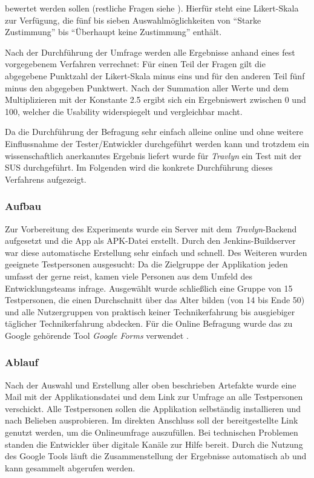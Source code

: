 bewertet werden sollen (restliche Fragen siehe \cite{Brooke.1996}). Hierfür steht eine Likert-Skala \cite{Joshi.2015} zur Verfügung, die fünf bis sieben Auswahlmöglichkeiten von \enquote{Starke Zustimmung} bis \enquote{Überhaupt keine Zustimmung} enthält.

\vspace{0.25cm}

Nach der Durchführung der Umfrage werden alle Ergebnisse anhand eines fest vorgegebenem Verfahren verrechnet: Für einen Teil der Fragen gilt die abgegebene Punktzahl der Likert-Skala minus eins und für den anderen Teil fünf minus den abgegeben Punktwert. Nach der Summation aller Werte und dem Multiplizieren mit der Konstante 2.5 ergibt sich ein Ergebniswert zwischen 0 und 100, welcher die Usability widerspiegelt und vergleichbar macht.

\vspace{0.25cm}

Da die Durchführung der Befragung sehr einfach alleine online und ohne weitere Einflussnahme der Tester/Entwickler durchgeführt werden kann und trotzdem ein wissenschaftlich anerkanntes Ergebnis liefert wurde für \textit{Travlyn} ein Test mit der \acs{SUS} durchgeführt. Im Folgenden wird die konkrete Durchführung dieses Verfahrens aufgezeigt.    
	
		\subsubsection{Aufbau}
		Zur Vorbereitung des Experiments wurde ein Server mit dem \textit{Travlyn}-Backend aufgesetzt und die App als \acs{APK}-Datei erstellt. Durch den Jenkins-Buildserver war diese automatische Erstellung sehr einfach und schnell. Des Weiteren wurden geeignete Testpersonen ausgesucht: Da die Zielgruppe der Applikation jeden umfasst der gerne reist, kamen viele Personen aus dem Umfeld des Entwicklungsteams infrage. Ausgewählt wurde schließlich eine Gruppe von 15 Testpersonen, die einen Durchschnitt über das Alter bilden (von 14 bis Ende 50) und alle Nutzergruppen von praktisch keiner Technikerfahrung bis ausgiebiger täglicher Technikerfahrung abdecken. Für die Online Befragung wurde das zu Google gehörende Tool \textit{Google Forms} verwendet \cite{Google.2020}.
		
		\subsubsection{Ablauf}
		Nach der Auswahl und Erstellung aller oben beschrieben Artefakte wurde eine Mail mit der Applikationsdatei und dem Link zur Umfrage an alle Testpersonen verschickt. Alle Testpersonen sollen die Applikation selbständig installieren und nach Belieben ausprobieren. Im direkten Anschluss soll der bereitgestellte Link genutzt werden, um die Onlineumfrage auszufüllen. Bei technischen Problemen standen die Entwickler über digitale Kanäle zur Hilfe bereit.
		Durch die Nutzung des Google Tools läuft die Zusammenstellung der Ergebnisse automatisch ab und kann gesammelt abgerufen werden.  
